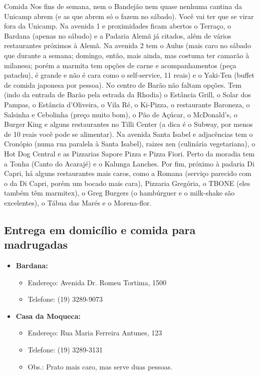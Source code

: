 \begin{story}{Comida}
Nos fins de semana, nem o Bandejão nem quase nenhuma cantina da Unicamp abrem (e as que abrem só o fazem no sábado). Você vai ter que se virar fora da Unicamp. Na avenida 1 e proximidades ficam abertos o Terraço, o Bardana (apenas no sábado) e a Padaria Alemã já citados, além de vários restaurantes próximos à Alemã. Na avenida 2 tem o Aulus (mais caro no sábado que durante a semana; domingo, então, mais ainda, mas costuma ter camarão à milanesa;  porém a marmita tem opções de carne e acompanhamentos (peça patachu), é grande e não é cara como o self-service, 11 reais) e o Yaki-Ten (buffet de comida japonesa por pessoa). No centro de Barão não faltam opções. Tem (indo da entrada de Barão pela estrada da Rhodia) o Estância Grill, o Solar dos Pampas, o Estância d’Oliveira, o Vila Ré, o Ki-Pizza, o restaurante Baroneza, o Salsinha e Cebolinha (preço muito bom), o Pão de Açúcar, o McDonald’s, o Burger King e alguns restaurantes no Tilli Center (a dica é o Subway, por menos de 10 reais você pode se alimentar). Na avenida Santa Isabel e adjacências tem o Cronópio (numa rua paralela à Santa Isabel), raizes zen (culinária vegetariana), o Hot Dog Central e as Pizzarias Sapore Pizza e Pizza Fiori. Perto da moradia tem a Tonha (Canto do Acarajé) e o Kalunga Lanches. Por fim, próximo à padaria Di Capri, há alguns restaurantes mais caros, como a Romana (serviço parecido com o da Di Capri, porém um bocado mais cara), Pizzaria Gregória, o TBONE (eles também têm marmitex), o Greg Burgers (o hambúrguer e o milk-shake são excelentes), o Tábua das Marés e o Morena-flor.

\subsection*{Entrega em domicílio e comida para madrugadas}

\begin{itemize}

\item \textbf{Bardana:}
\begin{itemize}
\item Endereço: Avenida Dr. Romeu Tortima, 1500
\item Telefone: (19) 3289-9073
\end{itemize}

\item \textbf{Casa da Moqueca:}
\begin{itemize}
\item Endereço: Rua Maria Ferreira Antunes, 123
\item Telefone: (19) 3289-3131
\item Obs.: Prato mais caro, mas serve duas pessoas.
\end{itemize}


\end{itemize}
\end{story}
